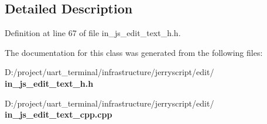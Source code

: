 \subsection{Detailed Description}


Definition at line 67 of file in\+\_\+js\+\_\+edit\+\_\+text\+\_\+h.\+h.



The documentation for this class was generated from the following files\+:\begin{DoxyCompactItemize}
\item 
D\+:/project/uart\+\_\+terminal/infrastructure/jerryscript/edit/\textbf{ in\+\_\+js\+\_\+edit\+\_\+text\+\_\+h.\+h}\item 
D\+:/project/uart\+\_\+terminal/infrastructure/jerryscript/edit/\textbf{ in\+\_\+js\+\_\+edit\+\_\+text\+\_\+cpp.\+cpp}\end{DoxyCompactItemize}
